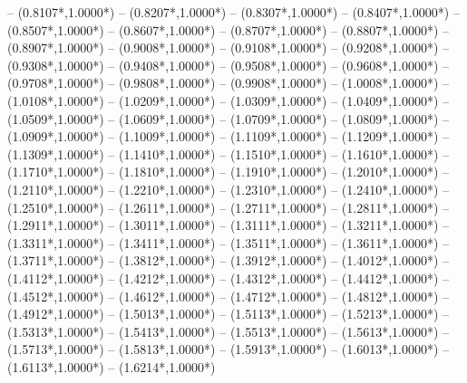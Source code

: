 {	-- ({0.8107*\dx},{1.0000*\dy})
	-- ({0.8207*\dx},{1.0000*\dy})
	-- ({0.8307*\dx},{1.0000*\dy})
	-- ({0.8407*\dx},{1.0000*\dy})
	-- ({0.8507*\dx},{1.0000*\dy})
	-- ({0.8607*\dx},{1.0000*\dy})
	-- ({0.8707*\dx},{1.0000*\dy})
	-- ({0.8807*\dx},{1.0000*\dy})
	-- ({0.8907*\dx},{1.0000*\dy})
	-- ({0.9008*\dx},{1.0000*\dy})
	-- ({0.9108*\dx},{1.0000*\dy})
	-- ({0.9208*\dx},{1.0000*\dy})
	-- ({0.9308*\dx},{1.0000*\dy})
	-- ({0.9408*\dx},{1.0000*\dy})
	-- ({0.9508*\dx},{1.0000*\dy})
	-- ({0.9608*\dx},{1.0000*\dy})
	-- ({0.9708*\dx},{1.0000*\dy})
	-- ({0.9808*\dx},{1.0000*\dy})
	-- ({0.9908*\dx},{1.0000*\dy})
	-- ({1.0008*\dx},{1.0000*\dy})
	-- ({1.0108*\dx},{1.0000*\dy})
	-- ({1.0209*\dx},{1.0000*\dy})
	-- ({1.0309*\dx},{1.0000*\dy})
	-- ({1.0409*\dx},{1.0000*\dy})
	-- ({1.0509*\dx},{1.0000*\dy})
	-- ({1.0609*\dx},{1.0000*\dy})
	-- ({1.0709*\dx},{1.0000*\dy})
	-- ({1.0809*\dx},{1.0000*\dy})
	-- ({1.0909*\dx},{1.0000*\dy})
	-- ({1.1009*\dx},{1.0000*\dy})
	-- ({1.1109*\dx},{1.0000*\dy})
	-- ({1.1209*\dx},{1.0000*\dy})
	-- ({1.1309*\dx},{1.0000*\dy})
	-- ({1.1410*\dx},{1.0000*\dy})
	-- ({1.1510*\dx},{1.0000*\dy})
	-- ({1.1610*\dx},{1.0000*\dy})
	-- ({1.1710*\dx},{1.0000*\dy})
	-- ({1.1810*\dx},{1.0000*\dy})
	-- ({1.1910*\dx},{1.0000*\dy})
	-- ({1.2010*\dx},{1.0000*\dy})
	-- ({1.2110*\dx},{1.0000*\dy})
	-- ({1.2210*\dx},{1.0000*\dy})
	-- ({1.2310*\dx},{1.0000*\dy})
	-- ({1.2410*\dx},{1.0000*\dy})
	-- ({1.2510*\dx},{1.0000*\dy})
	-- ({1.2611*\dx},{1.0000*\dy})
	-- ({1.2711*\dx},{1.0000*\dy})
	-- ({1.2811*\dx},{1.0000*\dy})
	-- ({1.2911*\dx},{1.0000*\dy})
	-- ({1.3011*\dx},{1.0000*\dy})
	-- ({1.3111*\dx},{1.0000*\dy})
	-- ({1.3211*\dx},{1.0000*\dy})
	-- ({1.3311*\dx},{1.0000*\dy})
	-- ({1.3411*\dx},{1.0000*\dy})
	-- ({1.3511*\dx},{1.0000*\dy})
	-- ({1.3611*\dx},{1.0000*\dy})
	-- ({1.3711*\dx},{1.0000*\dy})
	-- ({1.3812*\dx},{1.0000*\dy})
	-- ({1.3912*\dx},{1.0000*\dy})
	-- ({1.4012*\dx},{1.0000*\dy})
	-- ({1.4112*\dx},{1.0000*\dy})
	-- ({1.4212*\dx},{1.0000*\dy})
	-- ({1.4312*\dx},{1.0000*\dy})
	-- ({1.4412*\dx},{1.0000*\dy})
	-- ({1.4512*\dx},{1.0000*\dy})
	-- ({1.4612*\dx},{1.0000*\dy})
	-- ({1.4712*\dx},{1.0000*\dy})
	-- ({1.4812*\dx},{1.0000*\dy})
	-- ({1.4912*\dx},{1.0000*\dy})
	-- ({1.5013*\dx},{1.0000*\dy})
	-- ({1.5113*\dx},{1.0000*\dy})
	-- ({1.5213*\dx},{1.0000*\dy})
	-- ({1.5313*\dx},{1.0000*\dy})
	-- ({1.5413*\dx},{1.0000*\dy})
	-- ({1.5513*\dx},{1.0000*\dy})
	-- ({1.5613*\dx},{1.0000*\dy})
	-- ({1.5713*\dx},{1.0000*\dy})
	-- ({1.5813*\dx},{1.0000*\dy})
	-- ({1.5913*\dx},{1.0000*\dy})
	-- ({1.6013*\dx},{1.0000*\dy})
	-- ({1.6113*\dx},{1.0000*\dy})
	-- ({1.6214*\dx},{1.0000*\dy})
}
